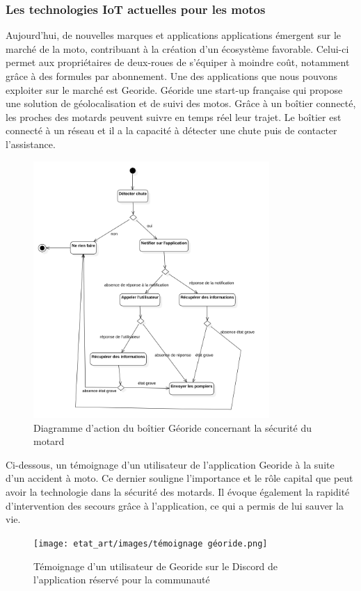 \subsubsection{Les technologies IoT actuelles pour les motos}
Aujourd’hui, de nouvelles marques et applications \cite{iot_accessoire_moto} applications émergent sur le marché de la moto, contribuant à la création d’un écosystème favorable. Celui-ci permet aux propriétaires de deux-roues de s’équiper à moindre coût, notamment grâce à des formules par abonnement. Une des applications que nous pouvons exploiter sur le marché est Georide. Géoride une start-up française qui propose une solution de géolocalisation et de suivi des motos. Grâce à un boîtier connecté, les proches des motards peuvent suivre en temps réel leur trajet. Le boîtier est connecté à un réseau et il a la capacité à détecter une chute puis de contacter l'assistance. 
\begin{figure}[H]
    \centering
    \includegraphics[width=0.8\textwidth]{images/diag_etat_georide.png} 
    \caption{Diagramme d'action du boîtier Géoride concernant la sécurité du motard}
\end{figure}
Ci-dessous, un témoignage d'un utilisateur de l'application Georide à la suite d'un accident à moto. Ce dernier souligne l'importance et le rôle capital que peut avoir la technologie dans la sécurité des motards. Il évoque également la rapidité d'intervention des secours grâce à l'application, ce qui a permis de lui sauver la vie.
\begin{figure}[H]
    \centering
    \texttt{[image: etat\_art/images/témoignage géoride.png]} 
    \caption{Témoignage d'un utilisateur de Georide sur le Discord de l'application réservé pour la communauté}
    \label{temoignage}
\end{figure}
